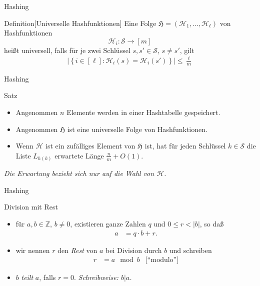 \documentclass[aspectratio=1610, 11pt]{beamer}
\newcommand\cH{\mathcal H}
\newcommand\cS{\mathcal S}
\newcommand\fH{\mathfrak H}
\newcommand\ZZ{\mathbb Z}
\newcommand{\abs}[1]{\left|#1\right|}
\newcommand\cbc[1]{\left\{{#1}\right\}}
\begin{document}
\begin{frame}{Hashing}
	\begin{block}{Definition\hfill[Universelle Hashfunktionen]}
		Eine Folge $\fH=(\cH_1,\ldots,\cH_\ell)$ von Hashfunktionen $$\cH_i:\cS\to[m]$$ hei\ss t \alert{universell}, falls f\"ur je zwei Schl\"ussel $s,s'\in\cS$, $s\neq s'$, gilt
		\begin{align}\label{eqdef_hash}
			\abs{\cbc{i\in[\ell]:\cH_i(s)=\cH_i(s')}}\leq\frac\ell m
		\end{align}
	\end{block}
\end{frame}

\begin{frame}{Hashing}
	\begin{block}{Satz}
		\begin{itemize}
			\item Angenommen $n$ Elemente werden in einer Hashtabelle gespeichert.
			\item Angenommen $\fH$ ist eine universelle Folge von Hashfunktionen.
			\item Wenn $\cH$ ist ein zuf\"alliges Element von $\fH$ ist, hat f\"ur jeden Schl\"ussel $k\in\cS$ die Liste $L_{h(k)}$ erwartete L\"ange $\frac nm+O(1)$.
		\end{itemize}
	\end{block}
	\begin{exampleblock}{}
		\em	Die Erwartung bezieht sich nur auf die Wahl von $\cH$.
	\end{exampleblock}
\end{frame}

\begin{frame}{Hashing}
	\begin{exampleblock}{Division mit Rest}
		\begin{itemize}
			\item f\"ur $a,b\in\ZZ$, $b\neq0$, existieren ganze Zahlen $q$ und $0\leq r<|b|$, so da\ss
				\begin{align*}
					a&=q\cdot b+r.
				\end{align*}
			\item wir nennen $r$ den {\em Rest} von $a$ bei Division durch $b$ und schreiben
				\begin{align*}
					r&=a\mod b&\mbox{[``modulo'']}
				\end{align*}
			\item $b$ {\em teilt} $a$, falls $r=0$.  \em Schreibweise: $b|a$.
		\end{itemize}
	\end{exampleblock}
\end{frame}
\end{document}
